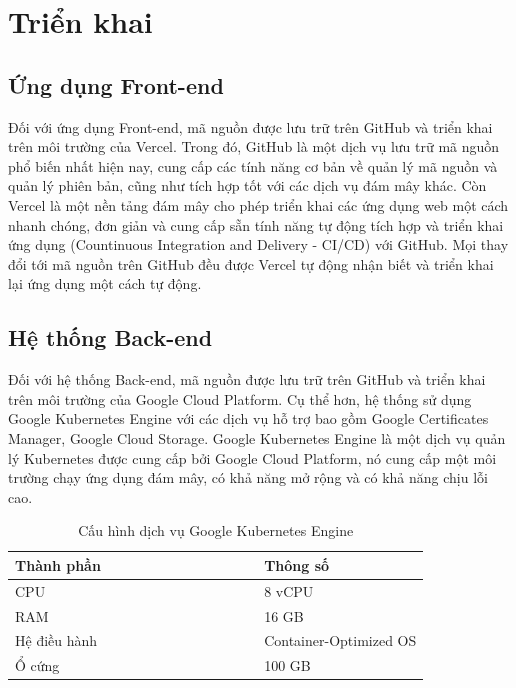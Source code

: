 \documentclass[../DoAn.tex]{subfiles}
\begin{document}
\newpage

\section{Triển khai}
\label{section:4.5}
\subsection{Ứng dụng Front-end}
\label{subsection:4.5.1}
Đối với ứng dụng Front-end, mã nguồn được lưu trữ trên GitHub và triển khai trên môi trường của Vercel. Trong đó, GitHub là một dịch vụ lưu trữ mã nguồn phổ biến nhất
hiện nay, cung cấp các tính năng cơ bản về quản lý mã nguồn và quản lý phiên bản, cũng như tích hợp tốt với các dịch vụ đám mây khác. Còn Vercel là một nền tảng đám mây
cho phép triển khai các ứng dụng web một cách nhanh chóng, đơn giản và cung cấp sẵn tính năng tự động tích hợp và triển khai ứng dụng (Countinuous Integration and Delivery - CI/CD) với GitHub.
Mọi thay đổi tới mã nguồn trên GitHub đều được Vercel tự động nhận biết và triển khai lại ứng dụng một cách tự động.

\subsection{Hệ thống Back-end}
\label{subsection:4.5.2}
Đối với hệ thống Back-end, mã nguồn được lưu trữ trên GitHub và triển khai trên môi trường của Google Cloud Platform. Cụ thể hơn, hệ thống sử dụng
Google Kubernetes Engine với các dịch vụ hỗ trợ bao gồm Google Certificates Manager, Google Cloud Storage. Google Kubernetes Engine là một dịch vụ quản lý
Kubernetes được cung cấp bởi Google Cloud Platform, nó cung cấp một môi trường chạy ứng dụng đám mây, có khả năng mở rộng và có khả năng chịu lỗi cao.

\begin{table}[H]
    \renewcommand{\arraystretch}{1.2}
    \centering{}
    \begin{tabular}{p{0.6\linewidth}p{0.4\linewidth}}
        \hline
        \textbf{Thành phần} & \textbf{Thông số}      \\ \hline
        CPU                 & 8 vCPU                 \\ \hline
        RAM                 & 16 GB                  \\ \hline
        Hệ điều hành        & Container-Optimized OS \\ \hline
        Ổ cứng              & 100 GB                 \\ \hline
    \end{tabular}
    \renewcommand{\arraystretch}{1}
    \caption{Cấu hình dịch vụ Google Kubernetes Engine}
    \label{fig:my_label}
\end{table}
\end{document}
